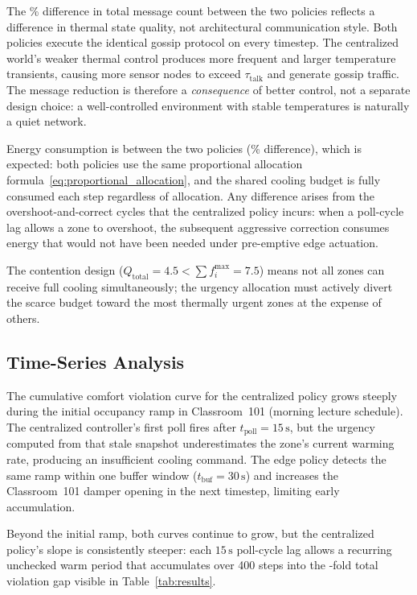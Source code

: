 \documentclass[conference]{IEEEtran}
\begin{document}
The \% difference in total message count between the two policies
reflects a difference in thermal state quality, not architectural
communication style.  Both policies execute the identical gossip protocol
on every timestep.  The centralized world's weaker thermal control produces
more frequent and larger temperature transients, causing more sensor nodes
to exceed $\tau_{\text{talk}}$ and generate gossip traffic.  The message
reduction is therefore a \emph{consequence} of better control, not a
separate design choice: a well-controlled environment with stable
temperatures is naturally a quiet network.

Energy consumption is  between the two policies
(\% difference), which is expected: both policies use the same
proportional allocation formula~\eqref{eq:proportional_allocation}, and the
shared cooling budget is fully consumed each step regardless of allocation.
Any difference arises from the overshoot-and-correct cycles that the
centralized policy incurs: when a poll-cycle lag allows a zone to overshoot,
the subsequent aggressive correction consumes energy that would not have been
needed under pre-emptive edge actuation.

The contention design ($Q_{\text{total}} = 4.5 < \sum f_i^{\max} = 7.5$)
means not all zones can receive full cooling simultaneously; the urgency
allocation must actively divert the scarce budget toward the most
thermally urgent zones at the expense of others.

\subsection{Time-Series Analysis}

The cumulative comfort violation curve for the centralized policy grows
steeply during the initial occupancy ramp in Classroom~101 (morning lecture
schedule).  The centralized controller's first poll fires after
$t_{\text{poll}} = 15\,\text{s}$, but the urgency computed from that stale
snapshot underestimates the zone's current warming rate, producing an
insufficient cooling command.  The edge policy detects the same ramp within
one buffer window ($t_{\text{buf}} = 30\,\text{s}$) and increases the
Classroom~101 damper opening in the next timestep, limiting early
accumulation.

Beyond the initial ramp, both curves continue to grow, but the centralized
policy's slope is consistently steeper: each $15\,\text{s}$ poll-cycle lag
allows a recurring unchecked warm period that accumulates over 400 steps
into the -fold total violation gap visible in
Table~\ref{tab:results}.
\end{document}
